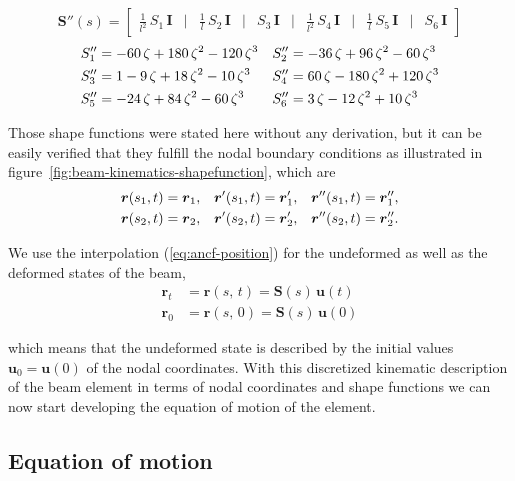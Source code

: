 \begin{equation}
\boldsymbol{S}''(s) =
\begin{bmatrix}
\frac{1}{l^2}\,S_1\,\boldsymbol{I} & \vert & \frac{1}{l}\,S_2\,\boldsymbol{I} & \vert & S_3\,\boldsymbol{I} & \vert & \frac{1}{l^2}\,S_4\,\boldsymbol{I} & \vert & \frac{1}{l}\,S_5\,\boldsymbol{I} & \vert & S_6\,\boldsymbol{I}
\end{bmatrix}
\end{equation}
%
\begin{align}
S_1'' &= -60\,\zeta + 180\,\zeta^2 - 120\,\zeta^3 & S_2'' &= -36\,\zeta + 96\,\zeta^2 - 60\,\zeta^3 \notag \\
S_3'' &= 1 - 9\,\zeta + 18\,\zeta^2 - 10\,\zeta^3 & S_4'' &= 60\,\zeta - 180\,\zeta^2 + 120\,\zeta^3 \notag \\
S_5'' &= -24\,\zeta + 84\,\zeta^2 - 60\,\zeta^3 & S_6'' &= 3\,\zeta - 12\,\zeta^2 + 10\,\zeta^3
\end{align}

Those shape functions were stated here without any derivation, but it can be easily verified that they fulfill the nodal boundary conditions as illustrated in figure~\ref{fig:beam-kinematics-shapefunction}, which are
%
\begin{align}
\boldsymbol{r}(s_1, t) &= \boldsymbol{r}_{1}, & \boldsymbol{r}'(s_1, t) &= \boldsymbol{r}'_{1}, & \boldsymbol{r}''(s_1, t) &= \boldsymbol{r}''_{1}, \notag \\
\boldsymbol{r}(s_2, t) &= \boldsymbol{r}_{2}, & \boldsymbol{r}'(s_2, t) &= \boldsymbol{r}'_{2}, & \boldsymbol{r}''(s_2, t) &= \boldsymbol{r}''_{2}.
\end{align}

We use the interpolation (\ref{eq:ancf-position}) for the undeformed as well as the deformed states of the beam,
%
\begin{align}
\boldsymbol{r}_{t} &= \boldsymbol{r}(s,\,t) = \boldsymbol{S}(s)\,\boldsymbol{u}(t)\\
\boldsymbol{r}_{0} &= \boldsymbol{r}(s,\,0) = \boldsymbol{S}(s)\,\boldsymbol{u}(0)
\end{align}

which means that the undeformed state is described by the initial values $\boldsymbol{u}_0 = \boldsymbol{u}(0)$ of the nodal coordinates.
With this discretized kinematic description of the beam element in terms of nodal coordinates and shape functions we can now start developing the equation of motion of the element.

\subsection{Equation of motion}

